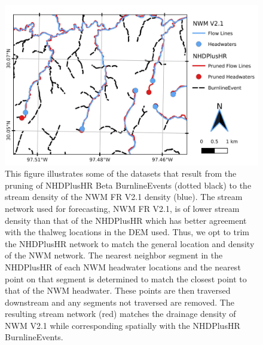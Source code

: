 \documentclass[draft]{dependencies/agujournal2019}
\begin{document}
\begin{figure}[H]
\centering
\includegraphics[scale=1.0]{figures/headwaters.jpg}
\caption{This figure illustrates some of the datasets that result from the pruning of NHDPlusHR Beta BurnlineEvents (dotted black) to the stream density of the NWM FR V2.1 density (blue).
The stream network used for forecasting, NWM FR V2.1, is of lower stream density than that of the NHDPlusHR which has better agreement with the thalweg locations in the DEM used.
Thus, we opt to trim the NHDPlusHR network to match the general location and density of the NWM network.
The nearest neighbor segment in the NHDPlusHR of each NWM headwater locations and the nearest point on that segment is determined to match the closest point to that of the NWM headwater.
These points are then traversed downstream and any segments not traversed are removed.
The resulting stream network (red) matches the drainage density of NWM V2.1 while corresponding spatially with the NHDPlusHR BurnlineEvents.}
\label{fig:stream_density_pruning}
\end{figure}
%
\end{document}
